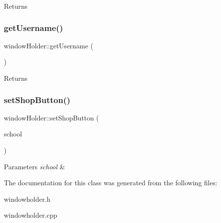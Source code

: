\begin{DoxyReturn}{Returns}

\end{DoxyReturn}
\mbox{\label{classwindow_holder_ad152c410bf87d7a04f4fde66253685c2}} 
\subsubsection{\texorpdfstring{get\+Username()}{getUsername()}}
{\footnotesize\ttfamily window\+Holder\+::get\+Username (\begin{DoxyParamCaption}{ }\end{DoxyParamCaption})\hspace{0.3cm}{\ttfamily [inline]}}

\begin{DoxyReturn}{Returns}

\end{DoxyReturn}
\mbox{\label{classwindow_holder_ab51ad6c3e9cdfd245729fe59958e00ce}} 
\subsubsection{\texorpdfstring{set\+Shop\+Button()}{setShopButton()}}
{\footnotesize\ttfamily window\+Holder\+::set\+Shop\+Button (\begin{DoxyParamCaption}\item[{Q\+String}]{school }\end{DoxyParamCaption})\hspace{0.3cm}{\ttfamily [inline]}}


\begin{DoxyParams}{Parameters}
{\em school} & \\
\hline
\end{DoxyParams}


The documentation for this class was generated from the following files\+:\begin{DoxyCompactItemize}
\item 
windowholder.\+h\item 
windowholder.\+cpp\end{DoxyCompactItemize}
